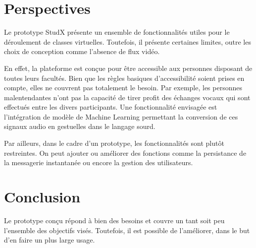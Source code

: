 \section{Perspectives}
Le prototype StudX présente un ensemble de fonctionnalités utiles pour le déroulement de classes virtuelles. 
Toutefois, il présente certaines limites, outre les choix de conception comme l’absence de flux vidéo. 

En effet, la plateforme est conçue pour être accessible aux personnes disposant de toutes leurs facultés. 
Bien que les règles basiques d'accessibilité soient prises en compte, 
elles ne couvrent pas totalement le besoin. Par exemple, les personnes malentendantes 
n’ont pas la capacité de tirer profit des échanges vocaux qui sont effectués entre les divers participants. 
Une fonctionnalité envisagée est l'intégration de modèle de Machine Learning permettant la conversion de 
ces signaux audio en gestuelles dans le langage sourd.

Par ailleurs, dans le cadre d’un prototype, les fonctionnalités sont plutôt restreintes. 
On peut ajouter ou améliorer des fonctions comme la persistance de la messagerie instantanée ou 
encore la gestion des utilisateurs.


\section*{Conclusion}
Le prototype conçu répond à bien des besoins et couvre un tant soit peu l’ensemble des objectifs visés. 
Toutefois, il est possible de l’améliorer, dans le but d’en faire un plus large usage.